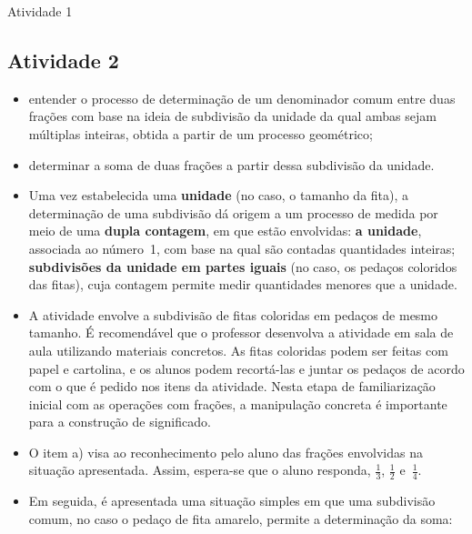 \begin{multicols}{2}
\begin{resposta*}{Atividade 1}
\end{resposta*}


\subsection{Atividade 2}

  \newline \vspace{.15cm}
  
\begin{itemize} %
    \item       entender o processo de determinação de um denominador comum entre duas frações com base na ideia de subdivisão da unidade da qual ambas sejam múltiplas inteiras, obtida a partir de um processo geométrico;
    \item       determinar a soma de duas frações a partir dessa subdivisão da unidade.
\end{itemize} %
  
  
   \vspace{.15cm}  
  
\begin{itemize} %
    \item       Uma vez estabelecida uma       {\bf unidade}       (no caso, o tamanho da fita), a determinação de uma subdivisão dá origem a um processo de medida por meio de uma       {\bf dupla contagem}, em que estão envolvidas:       {\bf a unidade}, associada ao número~1, com base na qual são contadas quantidades inteiras;       {\bf subdivisões da unidade em partes iguais}       (no caso, os pedaços coloridos das fitas), cuja contagem permite medir quantidades menores que a unidade.
    \item       A atividade envolve a subdivisão de fitas coloridas em pedaços de mesmo tamanho. É recomendável que o professor desenvolva a atividade em sala de aula utilizando materiais concretos. As fitas coloridas podem ser feitas com papel e cartolina, e os alunos podem recortá-las e juntar os pedaços de acordo com o que é pedido nos itens da atividade. Nesta etapa de familiarização inicial com as operações com frações, a manipulação concreta é importante para a construção de significado.
    \item       O item a) visa ao reconhecimento pelo aluno das frações envolvidas na situação apresentada. Assim, espera-se que o aluno responda,       $\frac{1}{3}$,       $\frac{1}{2}$       e~$\frac{1}{4}$.
    \item       Em seguida, é apresentada uma situação simples em que uma subdivisão comum, no caso o pedaço de fita amarelo, permite a determinação da soma:
\end{itemize} %
  

\end{multicols}
